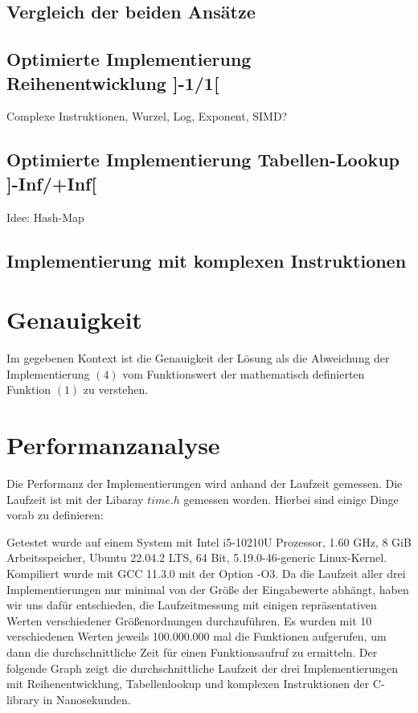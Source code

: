 \documentclass[course=erap] {aspdoc}
\begin{document}
    \subsection{Vergleich der beiden Ansätze}

    \subsection{Optimierte Implementierung Reihenentwicklung ]-1/1[}
    Complexe Instruktionen, Wurzel, Log, Exponent, SIMD?

    \subsection{Optimierte Implementierung Tabellen-Lookup ]-Inf/+Inf[}
    Idee: Hash-Map

    \subsection{Implementierung mit komplexen Instruktionen}


    \section{Genauigkeit}
    Im gegebenen Kontext ist die Genauigkeit der Lösung als die Abweichung der Implementierung $(4)$ vom Funktionswert der mathematisch definierten Funktion $(1)$ zu verstehen.


    \section{Performanzanalyse}
    Die Performanz der Implementierungen wird anhand der Laufzeit gemessen.
    Die Laufzeit ist mit der Libaray $time.h$ gemessen worden.
    Hierbei sind einige Dinge vorab zu definieren: 

    
    Getestet wurde auf einem System mit Intel i5-10210U Prozessor, 1.60 GHz, 8 GiB Arbeitsspeicher, Ubuntu 22.04.2 LTS, 64 Bit, 5.19.0-46-generic Linux-Kernel. Kompiliert wurde mit GCC 11.3.0 mit der Option -O3. Da die Laufzeit aller drei Implementierungen nur minimal von der Größe der Eingabewerte abhängt, haben wir uns dafür entschieden, die Laufzeitmessung mit einigen repräsentativen Werten verschiedener Größenordnungen durchzuführen. Es wurden mit 10 verschiedenen Werten jeweils 100.000.000 mal die Funktionen aufgerufen, um dann die durchschnittliche Zeit für einen Funktionsaufruf zu ermitteln. Der folgende Graph zeigt die durchschnittliche Laufzeit der drei Implementierungen mit Reihenentwicklung, Tabellenlookup und komplexen Instruktionen der C-library in Nanosekunden.
\end{document}
